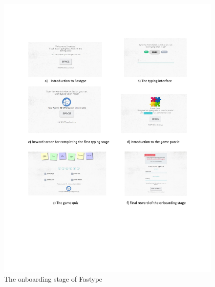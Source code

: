 \begin{figure}[]
  \centering
  \includegraphics[page=1,width=\textwidth]{figures/experiment2/oboarding.pdf}
  \caption{The onboarding stage of Fastype}
  \label{fig:onboarding}
\end{figure}